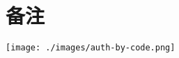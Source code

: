 \documentclass[12pt, a4paper, roman]{moderncv}
\begin{document}
\section{备注}
\texttt{[image: ./images/auth-by-code.png]}




% 

\end{document}
